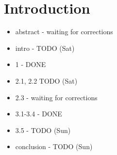 \chapter*{Introduction}

\begin{itemize}
\huge \color{red}
\item abstract - waiting for corrections
\item intro - TODO (Sat)
\item 1 - DONE
\item 2.1, 2.2 TODO (Sat)
\item 2.3 - waiting for corrections
\item 3.1-3.4 - DONE
\item 3.5 - TODO (Sun)
\item conclusion - TODO (Sun)
\end{itemize}
